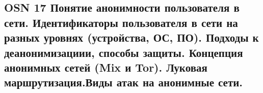\subsection{OSN 17 Понятие анонимности пользователя в сети. Идентификаторы пользователя в сети на разных уровнях (устройства, ОС, ПО). Подходы к деанонимизациии, способы защиты. Концепция анонимных сетей (Mix и Tor). Луковая маршрутизация.Виды атак на анонимные сети.}

